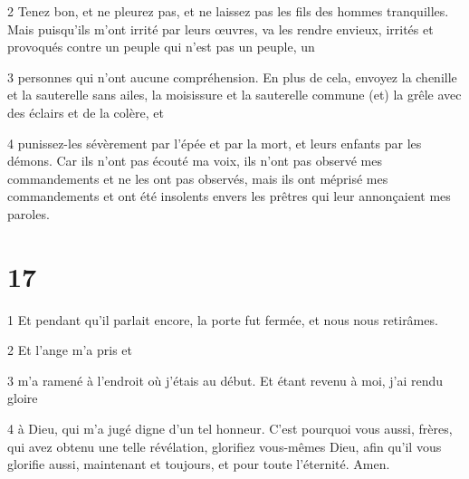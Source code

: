 \par 2 Tenez bon, et ne pleurez pas, et ne laissez pas les fils des hommes tranquilles. Mais puisqu'ils m'ont irrité par leurs œuvres, va les rendre envieux, irrités et provoqués contre un peuple qui n'est pas un peuple, un

\par 3 personnes qui n'ont aucune compréhension. En plus de cela, envoyez la chenille et la sauterelle sans ailes, la moisissure et la sauterelle commune (et) la grêle avec des éclairs et de la colère, et

\par 4 punissez-les sévèrement par l'épée et par la mort, et leurs enfants par les démons. Car ils n'ont pas écouté ma voix, ils n'ont pas observé mes commandements et ne les ont pas observés, mais ils ont méprisé mes commandements et ont été insolents envers les prêtres qui leur annonçaient mes paroles.

\chapter{17}

\par 1 Et pendant qu'il parlait encore, la porte fut fermée, et nous nous retirâmes.

\par 2 Et l'ange m'a pris et

\par 3 m'a ramené à l'endroit où j'étais au début. Et étant revenu à moi, j'ai rendu gloire

\par 4 à Dieu, qui m'a jugé digne d'un tel honneur. C'est pourquoi vous aussi, frères, qui avez obtenu une telle révélation, glorifiez vous-mêmes Dieu, afin qu'il vous glorifie aussi, maintenant et toujours, et pour toute l'éternité. Amen.

